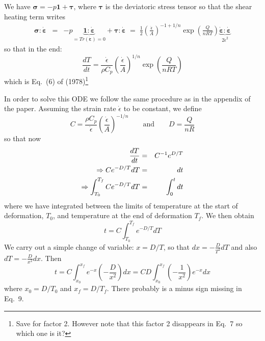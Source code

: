 We have ${\bm \sigma} = - p {\bm 1} + {\bm \tau}$, where ${\bm \tau}$ is the 
deviatoric stress tensor so that the shear heating term writes
\begin{eqnarray}
{\bm \sigma}:\dot{\bm \varepsilon} 
&=& - p \underbrace{{\bm 1}:\dot{\bm \varepsilon}}_{= Tr({\bm \dot\varepsilon})=0} + {\bm \tau}:\dot{\bm \varepsilon} 
\; = \; \frac12 \left(\frac{\dot\epsilon}{A} \right)^{-1+1/n}
\exp \left(\frac{Q}{nRT} \right) \underbrace{\dot{\bm \varepsilon}: \dot{\bm \varepsilon}}_{2 \dot\epsilon^2}
\end{eqnarray}
so that in the end:
\[
\boxed{
\frac{dT}{dt} = \frac{\dot\epsilon}{\rho C_p}  \left(\frac{\dot\epsilon}{A} \right)^{1/n}
\exp \left(\frac{Q}{nRT} \right)
}
\]
which is Eq.~(6) of \textcite{stuw98} (1978)\footnote{Save for factor 2. However note that this factor 2 
disappears in Eq.~7 so which one is it?}

In order to solve this ODE we follow the same procedure as in the appendix of the paper. 
Assuming the strain rate $\dot\epsilon$ to be constant, we define 
\[
C = \frac{\rho C_p}{ \dot\epsilon} \left(\frac{\dot\epsilon}{A} \right)^{-1/n}
\qquad
\text{and}
\qquad
D = \frac{Q}{nR}
\]
so that now
\begin{eqnarray}
\frac{dT}{dt} &=& C^{-1} e^{D/T} \nonumber\\
\Rightarrow C e^{-D/T}  dT &=&  dt \nonumber\\
\Rightarrow \int_{T_0}^{T_f} C e^{-D/T}  dT &=&  \int_0^t dt 
\end{eqnarray}
where we have integrated between the limits of temperature at the start of
deformation, $T_0$, and temperature at the end of deformation $T_f$.
We then obtain 
\[
t = C \int_{T_0}^{T_f} e^{-D/T}  dT
\]
We carry out a simple change of variable: $x=D/T$, so that $dx = -\frac{D}{T^2} dT$ 
and also $dT=-\frac{D}{x^2} dx$. Then 
\[
t = C \int_{x_0}^{x_f} e^{-x} \left(-\frac{D}{x^2} \right) dx 
= CD \int_{x_0}^{x_f} \left(-\frac{1}{x^2} \right) e^{-x} dx
\]
where $x_0=D/T_0$ and $x_f=D/T_f$. There probably is a minus sign missing in Eq.~9.

